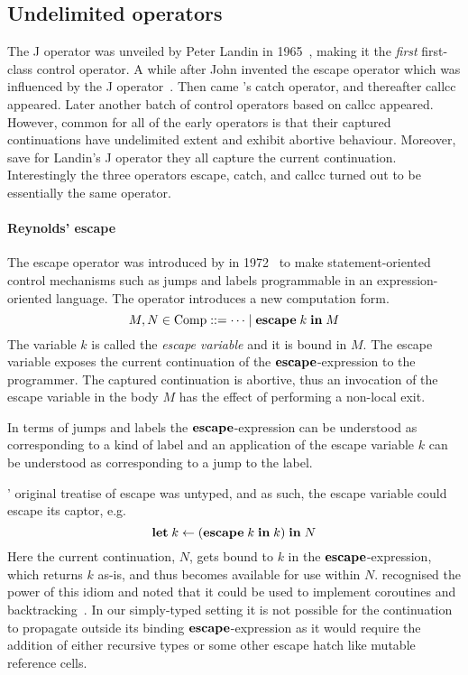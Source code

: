 \documentclass[12pt,phd,lfcs,twoside,openright,logo,leftchapter,normalheadings]{infthesis}
\theoremstyle{plain}
\theoremstyle{definition}
\begin{document}
\subsection{Undelimited operators}
%
The J operator was unveiled by Peter Landin in 1965~\cite{Landin98},
making it the \emph{first} first-class control operator. A while after
John \citeauthor{Reynolds98a} invented the escape operator which was
influenced by the J operator~\cite{Reynolds98a}. Then came
\citeauthor{SussmanS75}'s catch operator, and thereafter callcc
appeared. Later another batch of control operators based on callcc
appeared. However, common for all of the early operators is that their
captured continuations have undelimited extent and exhibit abortive
behaviour. Moreover, save for Landin's J operator they all capture the
current continuation. Interestingly the three operators escape, catch,
and callcc turned out to be essentially the same operator.

\paragraph{Reynolds' escape} The escape operator was introduced by
\citeauthor{Reynolds98a} in 1972~\cite{Reynolds98a} to make
statement-oriented control mechanisms such as jumps and labels
programmable in an expression-oriented language.
%
The operator introduces a new computation form.
%
\[
  M, N \in \textrm{Comp} ::= \cdots \mid \mathbf{escape}\;k\;\mathbf{in}\;M
\]
%
The variable $k$ is called the \emph{escape variable} and it is bound
in $M$. The escape variable exposes the current continuation of the
$\mathbf{escape}$-expression to the programmer. The captured continuation is
abortive, thus an invocation of the escape variable in the body $M$
has the effect of performing a non-local exit.
%

In terms of jumps and labels the $\mathbf{escape}$-expression can be
understood as corresponding to a kind of label and an application of
the escape variable $k$ can be understood as corresponding to a jump
to the label.

\citeauthor{Reynolds98a}' original treatise of escape was untyped, and
as such, the escape variable could escape its captor, e.g.
%
\[
  \mathbf{let}\;k \leftarrow (\mathbf{escape}\;k\;\mathbf{in}\;k)\;\mathbf{in}\; N
\]
%
Here the current continuation, $N$, gets bound to $k$ in the
$\mathbf{escape}$-expression, which returns $k$ as-is, and thus becomes
available for use within $N$. \citeauthor{Reynolds98a} recognised the
power of this idiom and noted that it could be used to implement
coroutines and backtracking~\cite{Reynolds98a}.
%
In our simply-typed setting it is not possible for the continuation to
propagate outside its binding $\mathbf{escape}$-expression as it would require
the addition of either recursive types or some other escape hatch like
mutable reference cells.
%
\end{document}
